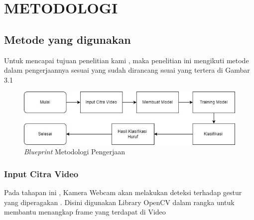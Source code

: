 \section{METODOLOGI}


\subsection{Metode yang digunakan}

Untuk mencapai tujuan penelitian kami , maka penelitian ini mengikuti metode dalam pengerjaannya sesuai yang sudah dirancang ssuai yang tertera di Gambar 3.1

\begin{figure} [ht] \centering
  \includegraphics[scale=0.5]{gambar/Metodologi_TA_Baru.jpg}
  \caption{\emph{Blueprint} Metodologi Pengerjaan}
  \label{fig:Blueprint}
\end{figure}

\subsubsection{Input Citra Video}
Pada tahapan ini , Kamera Webcam akan melakukan deteksi terhadap gestur yang diperagakan . Disini digunakan Library OpenCV dalam rangka untuk membantu menangkap frame yang terdapat di Video 

